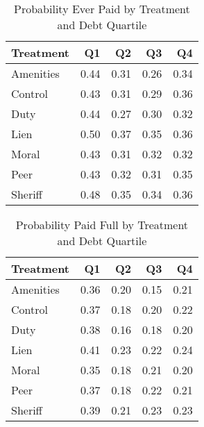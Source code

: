 \begin{table}[ht]
\centering
\begin{tabular}{lrrrr}
  \hline
Treatment & Q1 & Q2 & Q3 & Q4 \\ 
  \hline
Amenities & 0.44 & 0.31 & 0.26 & 0.34 \\ 
  Control & 0.43 & 0.31 & 0.29 & 0.36 \\ 
  Duty & 0.44 & 0.27 & 0.30 & 0.32 \\ 
  Lien & 0.50 & 0.37 & 0.35 & 0.36 \\ 
  Moral & 0.43 & 0.31 & 0.32 & 0.32 \\ 
  Peer & 0.43 & 0.32 & 0.31 & 0.35 \\ 
  Sheriff & 0.48 & 0.35 & 0.34 & 0.36 \\ 
   \hline
\end{tabular}
\caption{Probability Ever Paid by Treatment and Debt Quartile} 
\label{table_ever_paid_quartile}
\end{table}


\begin{table}[ht]
\centering
\begin{tabular}{lrrrr}
  \hline
Treatment & Q1 & Q2 & Q3 & Q4 \\ 
  \hline
Amenities & 0.36 & 0.20 & 0.15 & 0.21 \\ 
  Control & 0.37 & 0.18 & 0.20 & 0.22 \\ 
  Duty & 0.38 & 0.16 & 0.18 & 0.20 \\ 
  Lien & 0.41 & 0.23 & 0.22 & 0.24 \\ 
  Moral & 0.35 & 0.18 & 0.21 & 0.20 \\ 
  Peer & 0.37 & 0.18 & 0.22 & 0.21 \\ 
  Sheriff & 0.39 & 0.21 & 0.23 & 0.23 \\ 
   \hline
\end{tabular}
\caption{Probability Paid Full by Treatment and Debt Quartile} 
\label{table_paid_full_quartile}
\end{table}
